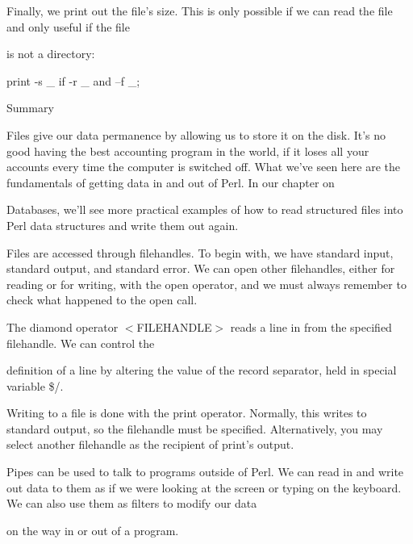 \documentclass[a4paper,11pt]{book}
\begin{document}
\noindent 

\noindent Finally, we print out the file's size. This is only possible if we can read the file and only useful if the file

\noindent is not a directory:

\noindent 

\noindent print -s \_  if -r \_  and --f \_;

\noindent 

\noindent 

\noindent Summary

\noindent 

\noindent Files give our data permanence by allowing us to store it on the disk. It's no good having the best accounting program in the world,  if it loses all your accounts every time the computer is switched off. What we've seen here are the fundamentals of getting data in and out of Perl. In our chapter on

\noindent Databases, we'll see more practical examples of how to read structured files into Perl data structures and write them out again.

\noindent 

\noindent Files are accessed through filehandles. To begin with, we have standard input, standard output, and standard error. We can open other filehandles, either for reading or for writing, with the open operator, and we must always remember to check what happened to the open call.

\noindent 

\noindent 

\noindent The diamond operator $<$FILEHANDLE$>$ reads a line in from the specified filehandle. We can control the

\noindent definition of a line by altering the value of the record separator, held in special variable \$/.

\noindent 

\noindent Writing to a file is done with the print operator. Normally, this writes to standard output, so the filehandle must be specified. Alternatively, you may select another filehandle as the recipient of print's output.

\noindent 

\noindent Pipes can be used to talk to programs outside of Perl. We can read in and write out data to them as if we were looking at the screen or typing on the keyboard. We can also use them as filters to modify our data

\noindent on the way in or out of a program.
\end{document}
